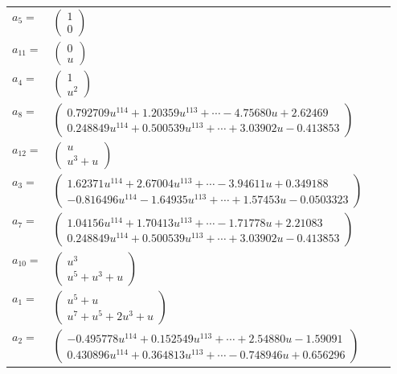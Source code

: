 \documentclass[1p]{elsarticle_modified}
\theoremstyle{definition}
\begin{document}
\begin{tabular}{m{7pt} m{180pt} m{7pt} m{180pt} }
\flushright $a_{5}=$&$\begin{pmatrix}1\\0\end{pmatrix}$ \\
\flushright $a_{11}=$&$\begin{pmatrix}0\\u\end{pmatrix}$ \\
\flushright $a_{4}=$&$\begin{pmatrix}1\\u^2\end{pmatrix}$ \\
\flushright $a_{8}=$&$\begin{pmatrix}0.792709 u^{114}+1.20359 u^{113}+\cdots-4.75680 u+2.62469\\0.248849 u^{114}+0.500539 u^{113}+\cdots+3.03902 u-0.413853\end{pmatrix}$ \\
\flushright $a_{12}=$&$\begin{pmatrix}u\\u^3+u\end{pmatrix}$ \\
\flushright $a_{3}=$&$\begin{pmatrix}1.62371 u^{114}+2.67004 u^{113}+\cdots-3.94611 u+0.349188\\-0.816496 u^{114}-1.64935 u^{113}+\cdots+1.57453 u-0.0503323\end{pmatrix}$ \\
\flushright $a_{7}=$&$\begin{pmatrix}1.04156 u^{114}+1.70413 u^{113}+\cdots-1.71778 u+2.21083\\0.248849 u^{114}+0.500539 u^{113}+\cdots+3.03902 u-0.413853\end{pmatrix}$ \\
\flushright $a_{10}=$&$\begin{pmatrix}u^3\\u^5+u^3+u\end{pmatrix}$ \\
\flushright $a_{1}=$&$\begin{pmatrix}u^5+u\\u^7+u^5+2 u^3+u\end{pmatrix}$ \\
\flushright $a_{2}=$&$\begin{pmatrix}-0.495778 u^{114}+0.152549 u^{113}+\cdots+2.54880 u-1.59091\\0.430896 u^{114}+0.364813 u^{113}+\cdots-0.748946 u+0.656296\end{pmatrix}$ \\

\end{tabular}
\end{document}
